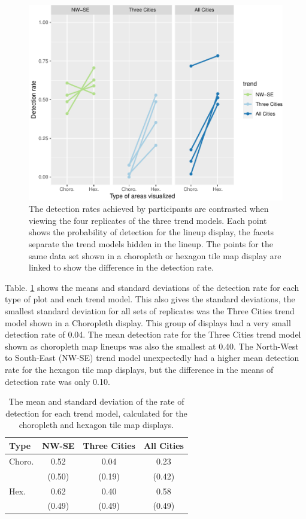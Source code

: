 \documentclass[journal]{vgtc}                     %
\begin{document}
\begin{figure}
\includegraphics[width=1\linewidth]{paper_files/figure-latex/detect-compare-1} \caption{The detection rates achieved by participants are contrasted when viewing the four replicates of the three trend models. Each point shows the probability of detection for the lineup display, the facets separate the trend models hidden in the lineup. The points for the same data set shown in a choropleth or hexagon tile map display are linked to show the difference in the detection rate.}\label{fig:detect-compare}
\end{figure}

Table. \ref{tab:desc-stats} shows the means and standard deviations of the detection rate for each type of plot and each trend model. This also gives the standard deviations, the smallest standard deviation for all sets of replicates was the Three Cities trend model shown in a Choropleth display. This group of displays had a very small detection rate of 0.04. The mean detection rate for the Three Cities trend model shown as choropleth map lineups was also the smallest at 0.40.
The North-West to South-East (NW-SE) trend model unexpectedly had a higher mean detection rate for the hexagon tile map displays, but the difference in the means of detection rate was only 0.10.

\begin{table}[h]
\caption{\label{tab:desc-stats}The mean and standard deviation of the rate of detection for each trend model, calculated for the choropleth and hexagon tile map displays.}
\centering
\begin{tabular}[t]{lccc}
\toprule
Type & NW-SE & Three Cities & All Cities\\
\midrule
Choro. & 0.52 & 0.04 & 0.23\\
 & (0.50) & (0.19) & (0.42)\\
\addlinespace
Hex. & 0.62 & 0.40 & 0.58\\
 & (0.49) & (0.49) & (0.49)\\
\bottomrule
\end{tabular}
\end{table}
\end{document}
